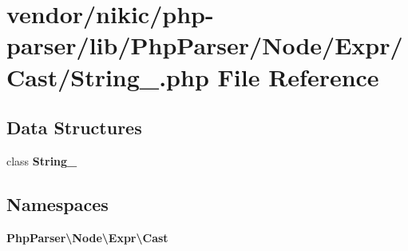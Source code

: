 \section{vendor/nikic/php-\/parser/lib/\+Php\+Parser/\+Node/\+Expr/\+Cast/\+String\+\_\+.php File Reference}
\label{_expr_2_cast_2_string___8php}
\subsection*{Data Structures}
\begin{DoxyCompactItemize}
\item 
class {\bf String\+\_\+}
\end{DoxyCompactItemize}
\subsection*{Namespaces}
\begin{DoxyCompactItemize}
\item 
 {\bf Php\+Parser\textbackslash{}\+Node\textbackslash{}\+Expr\textbackslash{}\+Cast}
\end{DoxyCompactItemize}
